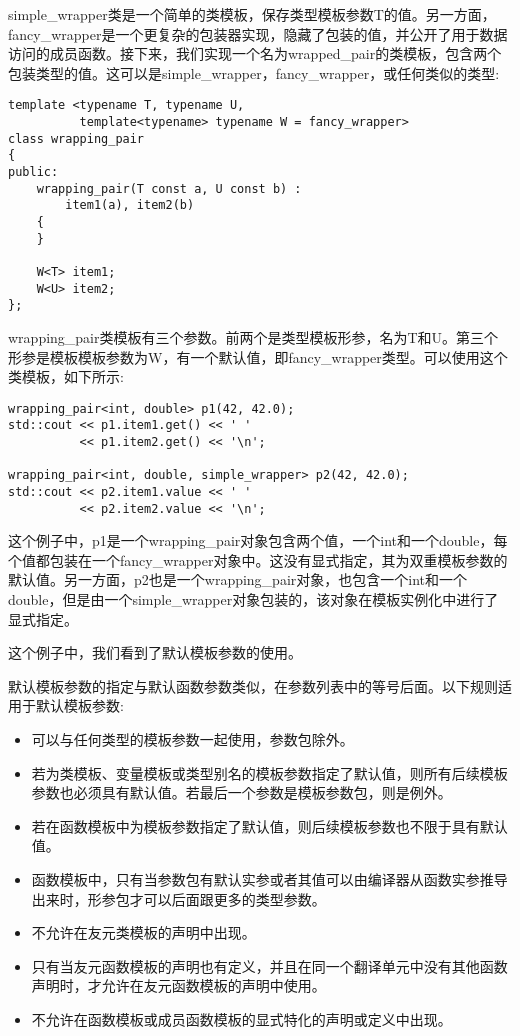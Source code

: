 simple\_wrapper类是一个简单的类模板，保存类型模板参数T的值。另一方面，fancy\_wrapper是一个更复杂的包装器实现，隐藏了包装的值，并公开了用于数据访问的成员函数。接下来，我们实现一个名为wrapped\_pair的类模板，包含两个包装类型的值。这可以是simple\_wrapper，fancy\_wrapper，或任何类似的类型:

\begin{lstlisting}[style=styleCXX]
template <typename T, typename U,
		  template<typename> typename W = fancy_wrapper>
class wrapping_pair
{
public:
	wrapping_pair(T const a, U const b) :
		item1(a), item2(b)
	{
	}

	W<T> item1;
	W<U> item2;
};
\end{lstlisting}

wrapping\_pair类模板有三个参数。前两个是类型模板形参，名为T和U。第三个形参是模板模板参数为W，有一个默认值，即fancy\_wrapper类型。可以使用这个类模板，如下所示:

\begin{lstlisting}[style=styleCXX]
wrapping_pair<int, double> p1(42, 42.0);
std::cout << p1.item1.get() << ' '
		  << p1.item2.get() << '\n';

wrapping_pair<int, double, simple_wrapper> p2(42, 42.0);
std::cout << p2.item1.value << ' '
		  << p2.item2.value << '\n';
\end{lstlisting}

这个例子中，p1是一个wrapping\_pair对象包含两个值，一个int和一个double，每个值都包装在一个fancy\_wrapper对象中。这没有显式指定，其为双重模板参数的默认值。另一方面，p2也是一个wrapping\_pair对象，也包含一个int和一个double，但是由一个simple\_wrapper对象包装的，该对象在模板实例化中进行了显式指定。

这个例子中，我们看到了默认模板参数的使用。


默认模板参数的指定与默认函数参数类似，在参数列表中的等号后面。以下规则适用于默认模板参数:

\begin{itemize}
\item 
可以与任何类型的模板参数一起使用，参数包除外。

\item 
若为类模板、变量模板或类型别名的模板参数指定了默认值，则所有后续模板参数也必须具有默认值。若最后一个参数是模板参数包，则是例外。

\item 
若在函数模板中为模板参数指定了默认值，则后续模板参数也不限于具有默认值。

\item 
函数模板中，只有当参数包有默认实参或者其值可以由编译器从函数实参推导出来时，形参包才可以后面跟更多的类型参数。

\item 
不允许在友元类模板的声明中出现。

\item 
只有当友元函数模板的声明也有定义，并且在同一个翻译单元中没有其他函数声明时，才允许在友元函数模板的声明中使用。

\item 
不允许在函数模板或成员函数模板的显式特化的声明或定义中出现。
\end{itemize}

